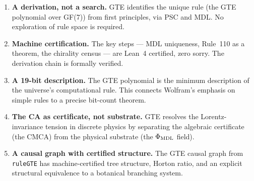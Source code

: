 \documentclass[11pt,a4paper]{article}
\begin{document}
\begin{tcolorbox}[colback=boxgreen,colframe=green!50!black,
  title=The five contributions]
\begin{enumerate}[itemsep=4pt]
  \item \textbf{A derivation, not a search.}  GTE identifies the unique rule
    (the GTE polynomial over GF(7)) from first principles, via PSC and MDL.
    No exploration of rule space is required.

  \item \textbf{Machine certification.}  The key steps — MDL uniqueness, Rule~110
    as a theorem, the chirality census — are Lean~4 certified, zero sorry.
    The derivation chain is formally verified.

  \item \textbf{A 19-bit description.}  The GTE polynomial is the minimum
    description of the universe's computational rule.  This connects Wolfram's
    emphasis on simple rules to a precise bit-count theorem.

  \item \textbf{The CA as certificate, not substrate.}  GTE resolves the
    Lorentz-invariance tension in discrete physics by separating the algebraic
    certificate (the CMCA) from the physical substrate (the $\Phi_{\rm MDL}$
    field).

  \item \textbf{A causal graph with certified structure.}  The GTE causal graph
    from \texttt{ruleGTE} has machine-certified tree structure, Horton ratio, and
    an explicit structural equivalence to a botanical branching system.
\end{enumerate}
\end{tcolorbox}
\end{document}
